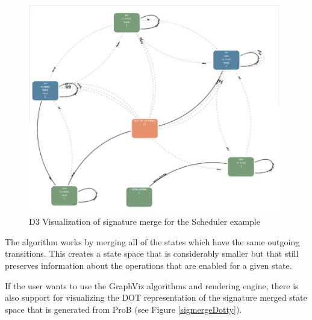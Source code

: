 \begin{center}
\begin{figure}[h!]
\centering
\includegraphics[width=11cm]{bilder/sigmerge.png}
\caption{D3 Visualization of signature merge for the Scheduler example}
\label{sigmerge}
\end{figure}
\end{center}


The algorithm works by merging all of the states which have the same outgoing transitions. This creates a state space that is considerably smaller but that still preserves information about the operations that are enabled for a given state. 

If the user wants to use the GraphViz algorithms and rendering engine, there is also support for visualizing the DOT representation of the signature merged state space that is generated from ProB (see Figure \ref{sigmergeDotty}). 

